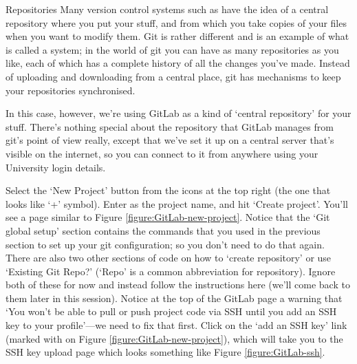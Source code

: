 \begin{diversion}{Repositories}
Many version control systems such as  have the idea of a central repository where you put your stuff, and from which you take copies of your files when you want to modify them. Git is rather different and is an example of what is called a  system; in the world of git you can have as many repositories as you like, each of which has a complete history of all the changes you've made. Instead of uploading and downloading from a central place, git has mechanisms to keep your repositories synchronised. 

In this case, however, we're using GitLab as a kind of `central repository' for your stuff. There's nothing special about the repository that GitLab manages from git's point of view really, except that we've set it up on a central server that's visible on the internet, so you can connect to it from anywhere using your University login details.
\end{diversion}

Select the `New Project' button from the icons at the top right (the one that looks like `+' symbol). Enter  as the project name, and hit `Create project'. You'll see a page similar to Figure \ref{figure:GitLab-new-project}. Notice that the `Git global setup' section contains the commands that you used in the previous section to set up your git configuration; so you don't need to do that again. There are also two other sections of code on how to `create repository' or use `Existing Git Repo?' (`Repo' is a common abbreviation for repository). Ignore both of these for now and instead follow the instructions here (we'll come back to them later in this session). Notice at the top of the GitLab page a warning that `You won't be able to pull or push project code via SSH until you add an SSH key to your profile'---we need to fix that first. Click on the `add an SSH key' link (marked with \protect{} on Figure \ref{figure:GitLab-new-project}), which will take you to the SSH key upload page which looks something like Figure \ref{figure:GitLab-ssh}.

